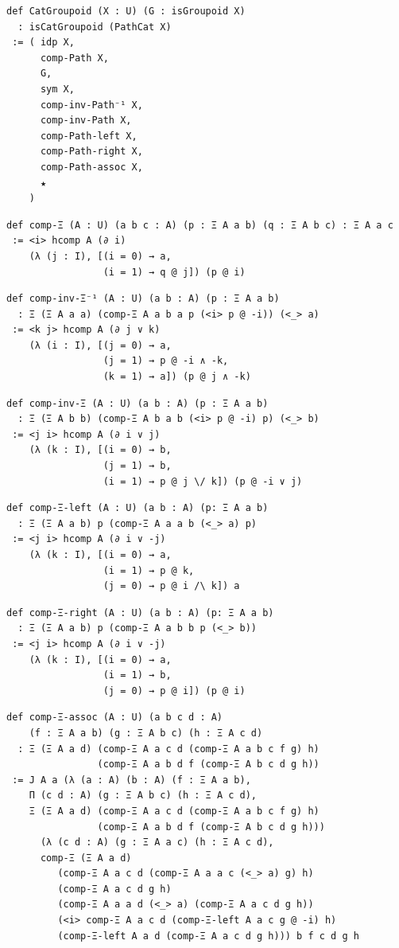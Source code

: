 \documentclass{article}
\theoremstyle{definition}
\begin{document}
\begin{lstlisting}
def CatGroupoid (X : U) (G : isGroupoid X)
  : isCatGroupoid (PathCat X)
 := ( idp X,
      comp-Path X,
      G,
      sym X,
      comp-inv-Path⁻¹ X,
      comp-inv-Path X,
      comp-Path-left X,
      comp-Path-right X,
      comp-Path-assoc X,
      ★
    )
\end{lstlisting}

\begin{lstlisting}
def comp-Ξ (A : U) (a b c : A) (p : Ξ A a b) (q : Ξ A b c) : Ξ A a c
 := <i> hcomp A (∂ i)
    (λ (j : I), [(i = 0) → a,
                 (i = 1) → q @ j]) (p @ i)
\end{lstlisting}

\begin{lstlisting}
def comp-inv-Ξ⁻¹ (A : U) (a b : A) (p : Ξ A a b)
  : Ξ (Ξ A a a) (comp-Ξ A a b a p (<i> p @ -i)) (<_> a)
 := <k j> hcomp A (∂ j ∨ k)
    (λ (i : I), [(j = 0) → a,
                 (j = 1) → p @ -i ∧ -k,
                 (k = 1) → a]) (p @ j ∧ -k)
\end{lstlisting}

\begin{lstlisting}
def comp-inv-Ξ (A : U) (a b : A) (p : Ξ A a b)
  : Ξ (Ξ A b b) (comp-Ξ A b a b (<i> p @ -i) p) (<_> b)
 := <j i> hcomp A (∂ i ∨ j)
    (λ (k : I), [(i = 0) → b,
                 (j = 1) → b,
                 (i = 1) → p @ j \/ k]) (p @ -i ∨ j)
\end{lstlisting}

\begin{lstlisting}
def comp-Ξ-left (A : U) (a b : A) (p: Ξ A a b)
  : Ξ (Ξ A a b) p (comp-Ξ A a a b (<_> a) p)
 := <j i> hcomp A (∂ i ∨ -j)
    (λ (k : I), [(i = 0) → a,
                 (i = 1) → p @ k,
                 (j = 0) → p @ i /\ k]) a
\end{lstlisting}

\begin{lstlisting}
def comp-Ξ-right (A : U) (a b : A) (p: Ξ A a b)
  : Ξ (Ξ A a b) p (comp-Ξ A a b b p (<_> b))
 := <j i> hcomp A (∂ i ∨ -j)
    (λ (k : I), [(i = 0) → a,
                 (i = 1) → b,
                 (j = 0) → p @ i]) (p @ i)
\end{lstlisting}

\begin{lstlisting}
def comp-Ξ-assoc (A : U) (a b c d : A)
    (f : Ξ A a b) (g : Ξ A b c) (h : Ξ A c d)
  : Ξ (Ξ A a d) (comp-Ξ A a c d (comp-Ξ A a b c f g) h)
                (comp-Ξ A a b d f (comp-Ξ A b c d g h))
 := J A a (λ (a : A) (b : A) (f : Ξ A a b),
    Π (c d : A) (g : Ξ A b c) (h : Ξ A c d),
    Ξ (Ξ A a d) (comp-Ξ A a c d (comp-Ξ A a b c f g) h)
                (comp-Ξ A a b d f (comp-Ξ A b c d g h)))
      (λ (c d : A) (g : Ξ A a c) (h : Ξ A c d),
      comp-Ξ (Ξ A a d)
         (comp-Ξ A a c d (comp-Ξ A a a c (<_> a) g) h)
         (comp-Ξ A a c d g h)
         (comp-Ξ A a a d (<_> a) (comp-Ξ A a c d g h))
         (<i> comp-Ξ A a c d (comp-Ξ-left A a c g @ -i) h)
         (comp-Ξ-left A a d (comp-Ξ A a c d g h))) b f c d g h
\end{lstlisting}
\end{document}
